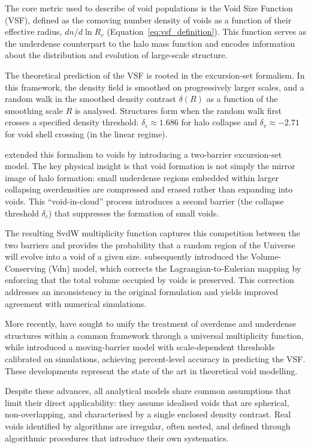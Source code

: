 \documentclass[12pt]{report}
\begin{document}
The core metric used to describe of void populations is the Void Size Function (VSF), defined as the comoving number density of voids as a function of their effective radius, $dn/d\ln R_v$ (Equation~\ref{eq:vsf_definition}). This function serves as the underdense counterpart to the halo mass function and encodes information about the distribution and evolution of large-scale structure.

The theoretical prediction of the VSF is rooted in the excursion-set formalism. In this framework, the density field is smoothed on progressively larger scales, and a random walk in the smoothed density contrast $\delta(R)$ as a function of the smoothing scale $R$ is analysed. Structures form when the random walk first crosses a specified density threshold: $\delta_c \approx 1.686$ for halo collapse and $\delta_v \approx -2.71$ for void shell crossing (in the linear regime).

\citet{Sheth2004} extended this formalism to voids by introducing a two-barrier excursion-set model. The key physical insight is that void formation is not simply the mirror image of halo formation: small underdense regions embedded within larger collapsing overdensities are compressed and erased rather than expanding into voids. This ``void-in-cloud'' process introduces a second barrier (the collapse threshold $\delta_c$) that suppresses the formation of small voids.

The resulting SvdW multiplicity function captures this competition between the two barriers and provides the probability that a random region of the Universe will evolve into a void of a given size. \citet{Jennings2013} subsequently introduced the Volume-Conserving (Vdn) model, which corrects the Lagrangian-to-Eulerian mapping by enforcing that the total volume occupied by voids is preserved. This correction addresses an inconsistency in the original formulation and yields improved agreement with numerical simulations.

More recently, \citet{Paranjape2024} have sought to unify the treatment of overdense and underdense structures within a common framework through a universal multiplicity function, while \citet{Verza2024} introduced a moving-barrier model with scale-dependent thresholds calibrated on simulations, achieving percent-level accuracy in predicting the VSF. These developments represent the state of the art in theoretical void modelling.

Despite these advances, all analytical models share common assumptions that limit their direct applicability: they assume idealised voids that are spherical, non-overlapping, and characterised by a single enclosed density contrast. Real voids identified by algorithms are irregular, often nested, and defined through algorithmic procedures that introduce their own systematics.
\end{document}
